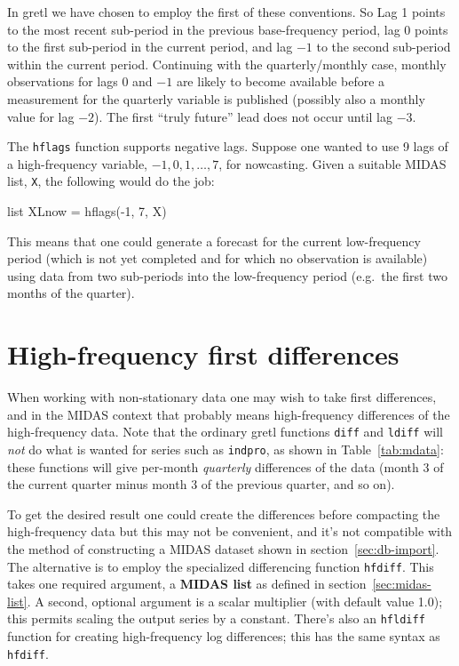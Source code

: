 \documentclass{article}
\begin{document}
In gretl we have chosen to employ the first of these conventions. So
Lag 1 points to the most recent sub-period in the previous
base-frequency period, lag 0 points to the first sub-period in the
current period, and lag $-1$ to the second sub-period within the
current period. Continuing with the quarterly/monthly case, monthly
observations for lags 0 and $-1$ are likely to become available before
a measurement for the quarterly variable is published (possibly also a
monthly value for lag $-2$). The first ``truly future'' lead does not
occur until lag $-3$.

The \texttt{hflags} function supports negative lags. Suppose one
wanted to use 9 lags of a high-frequency variable,
$-1, 0, 1,\ldots, 7$, for nowcasting. Given a suitable MIDAS list,
\texttt{X}, the following would do the job:
\begin{code}
list XLnow = hflags(-1, 7, X)
\end{code}

This means that one could generate a forecast for the current
low-frequency period (which is not yet completed and for which no
observation is available) using data from two sub-periods into the
low-frequency period (e.g.\ the first two months of the quarter).

\section{High-frequency first differences}

When working with non-stationary data one may wish to take first
differences, and in the MIDAS context that probably means
high-frequency differences of the high-frequency data. Note that the
ordinary gretl functions \texttt{diff} and \texttt{ldiff} will
\textit{not} do what is wanted for series such as \texttt{indpro}, as
shown in Table~\ref{tab:mdata}: these functions will give per-month
\textit{quarterly} differences of the data (month 3 of the current
quarter minus month 3 of the previous quarter, and so on).

To get the desired result one could create the differences before
compacting the high-frequency data but this may not be convenient, and
it's not compatible with the method of constructing a MIDAS dataset
shown in section~\ref{sec:db-import}. The alternative is to employ the
specialized differencing function \texttt{hfdiff}. This takes one
required argument, a \textbf{MIDAS list} as defined in
section~\ref{sec:midas-list}. A second, optional argument is a scalar
multiplier (with default value 1.0); this permits scaling the output
series by a constant. There's also an \texttt{hfldiff} function for
creating high-frequency log differences; this has the same syntax as
\texttt{hfdiff}.
\end{document}
